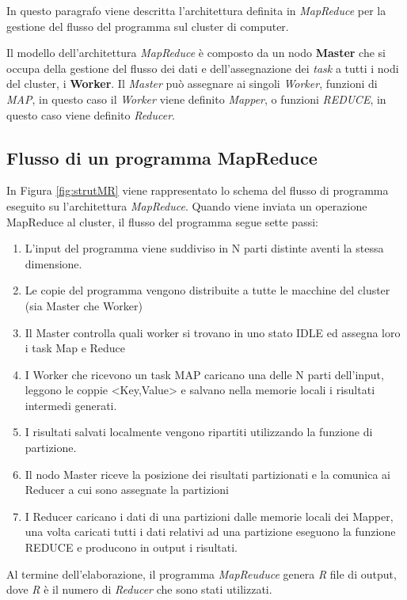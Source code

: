 \documentclass[LaM,binding=0.6cm]{sapthesis}
\begin{document}
In questo paragrafo viene descritta l'architettura definita in \textit{MapReduce} \cite{Dean:2008:MSD:1327452.1327492} per la gestione del flusso del programma sul cluster di computer.

Il modello dell'architettura \textit{MapReduce} è composto da un nodo \textbf{Master} che si occupa della gestione del flusso dei dati e dell'assegnazione dei \textit{task} a  tutti i nodi del cluster, i \textbf{Worker}.
Il \textit{Master}  può assegnare ai singoli \textit{Worker}, funzioni di \textit{MAP}, in questo caso il \textit{Worker} viene definito \textit{Mapper}, o funzioni \textit{REDUCE}, in questo caso viene definito \textit{Reducer}.

\subsection{Flusso di un programma MapReduce}

In Figura \ref{fig:strutMR} viene rappresentato lo schema del flusso di programma eseguito su l'architettura \textit{MapReduce}. Quando viene inviata un operazione MapReduce al cluster, il flusso del programma segue sette passi:

\begin{enumerate}
\item L’input del programma viene suddiviso in N parti distinte aventi la stessa dimensione.
\item Le copie del programma vengono distribuite a tutte le macchine del cluster (sia Master che Worker)
\item Il Master controlla quali worker si trovano in uno stato IDLE ed assegna loro i task Map e Reduce
\item I Worker che ricevono un task MAP caricano una delle N parti dell'input, leggono le coppie <Key,Value> e salvano nella memorie locali i risultati intermedi generati.
\item I risultati salvati localmente vengono ripartiti utilizzando la funzione di partizione.
\item Il nodo Master riceve la posizione dei risultati partizionati e la comunica ai Reducer a cui sono assegnate la partizioni
\item I Reducer caricano i dati di una partizioni dalle memorie locali dei Mapper, una volta caricati tutti i dati relativi ad una partizione eseguono la funzione REDUCE e producono in output i risultati.
\end{enumerate}
Al termine dell'elaborazione, il programma \textit{MapReuduce} genera \textit{R} file di output, dove \textit{R} è il numero di \textit{Reducer} che sono stati utilizzati.
\end{document}

